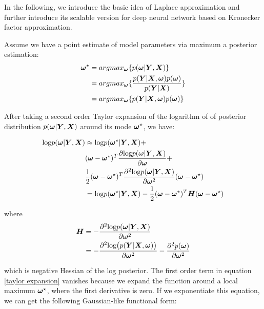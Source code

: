 In the following, we introduce the basic idea of Laplace approximation and further introduce its scalable version for deep neural network based on Kronecker factor approximation.

Assume we have a point estimate of model parameters via maximum a posterior estimation:
\begin{equation}
\begin{aligned} \label{point estimate}
\boldsymbol \omega^\star &= argmax_{\boldsymbol \omega}\{p(\boldsymbol \omega|\boldsymbol Y,\boldsymbol X)\} \\
&= argmax_{\boldsymbol \omega}\{\frac{p(\boldsymbol Y|\boldsymbol X, \boldsymbol \omega) p(\boldsymbol \omega)}{p(\boldsymbol Y | \boldsymbol X)}\} \\
&= argmax_{\boldsymbol \omega}\{p(\boldsymbol Y|\boldsymbol X, \boldsymbol \omega) p(\boldsymbol \omega)\}
\end{aligned}
\end{equation}


After taking a second order Taylor expansion of the logarithm of of posterior distribution $p(\boldsymbol \omega | \boldsymbol Y, \boldsymbol X)$ around its mode $\boldsymbol \omega^\star$, we have:

\begin{equation}
\begin{aligned} \label{taylor expansion}
\text{log} p(\boldsymbol \omega| \boldsymbol Y, \boldsymbol X) &\approx 
\text{log}p(\boldsymbol \omega^\star|\boldsymbol Y, \boldsymbol X) + \\
&(\boldsymbol \omega - \boldsymbol \omega^\star)^T\frac{\partial \text{log} p(\boldsymbol \omega| \boldsymbol Y, \boldsymbol X)}{\partial \boldsymbol \omega} + \\
&\frac{1}{2}(\boldsymbol \omega - \boldsymbol \omega^\star)^T\frac{\partial^2\text{log} p(\boldsymbol \omega |\boldsymbol Y, \boldsymbol X)}{\partial \boldsymbol \omega^2}(\boldsymbol \omega - \boldsymbol \omega^\star)\\
&= \text{log}p(\boldsymbol \omega^\star|\boldsymbol Y, \boldsymbol X) - \frac{1}{2}(\boldsymbol \omega - \boldsymbol \omega^\star)^T\boldsymbol H(\boldsymbol \omega - \boldsymbol \omega^\star)
\end{aligned}
\end{equation}


where 
\[
\begin{aligned}
\boldsymbol H &= -\frac{\partial^2\text{log} p(\boldsymbol \omega|\boldsymbol Y, \boldsymbol X)}{\partial \boldsymbol \omega^2}\\
&=-\frac{\partial^2\text{log}\big(p(\boldsymbol Y|\boldsymbol X, \boldsymbol \omega)\big)}{\partial \boldsymbol \omega^2} - \frac{\partial^2p(\boldsymbol \omega)}{\partial\boldsymbol \omega^2}
\end{aligned}
\]

which is negative Hessian of the log posterior. The first order term in equation \ref{taylor expansion} vanishes because we expand the function around a local maximum $\boldsymbol \omega^\star$, where the first derivative is zero. If we exponentiate this equation, we can get the following Gaussian-like functional form: 

